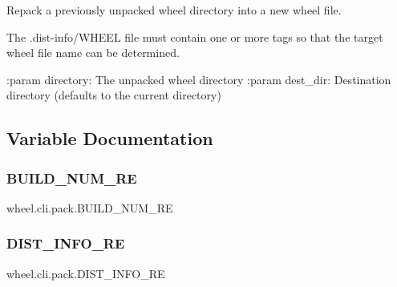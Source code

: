 \begin{DoxyVerb}Repack a previously unpacked wheel directory into a new wheel file.

The .dist-info/WHEEL file must contain one or more tags so that the target
wheel file name can be determined.

:param directory: The unpacked wheel directory
:param dest_dir: Destination directory (defaults to the current directory)
\end{DoxyVerb}
 

\subsection{Variable Documentation}
\mbox{\label{namespacewheel_1_1cli_1_1pack_a8574461e0b938e0799943d876ef111d6}} 
\subsubsection{\texorpdfstring{B\+U\+I\+L\+D\+\_\+\+N\+U\+M\+\_\+\+RE}{BUILD\_NUM\_RE}}
{\footnotesize\ttfamily wheel.\+cli.\+pack.\+B\+U\+I\+L\+D\+\_\+\+N\+U\+M\+\_\+\+RE}

\mbox{\label{namespacewheel_1_1cli_1_1pack_aa760789f1d139f14861a51ed11af0eb6}} 
\subsubsection{\texorpdfstring{D\+I\+S\+T\+\_\+\+I\+N\+F\+O\+\_\+\+RE}{DIST\_INFO\_RE}}
{\footnotesize\ttfamily wheel.\+cli.\+pack.\+D\+I\+S\+T\+\_\+\+I\+N\+F\+O\+\_\+\+RE}

